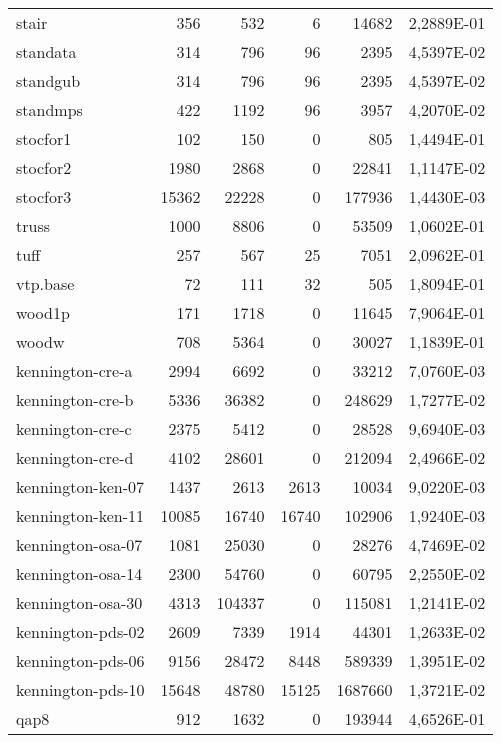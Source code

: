 {\begin{longtable}{>{\ttfamily}lrrrrc}
stair        		& 356       & 532       & 6           & 14682    & \num{2,2889E-01} \\
standata     		& 314       & 796       & 96          & 2395     & \num{4,5397E-02} \\
standgub     		& 314       & 796       & 96          & 2395     & \num{4,5397E-02} \\
standmps     		& 422       & 1192      & 96          & 3957     & \num{4,2070E-02} \\
stocfor1     		& 102       & 150       & 0           & 805      & \num{1,4494E-01} \\
stocfor2     		& 1980      & 2868      & 0           & 22841    & \num{1,1147E-02} \\
stocfor3     		& 15362     & 22228     & 0           & 177936   & \num{1,4430E-03} \\
truss        		& 1000      & 8806      & 0           & 53509    & \num{1,0602E-01} \\
tuff         		& 257       & 567       & 25          & 7051     & \num{2,0962E-01} \\
vtp.base     		& 72        & 111       & 32          & 505      & \num{1,8094E-01} \\
wood1p       		& 171       & 1718      & 0           & 11645    & \num{7,9064E-01} \\
woodw        		& 708       & 5364      & 0           & 30027    & \num{1,1839E-01} \\
kennington-cre-a    & 2994      & 6692      & 0           & 33212    & \num{7,0760E-03} \\
kennington-cre-b    & 5336      & 36382     & 0           & 248629   & \num{1,7277E-02} \\
kennington-cre-c    & 2375      & 5412      & 0           & 28528    & \num{9,6940E-03} \\
kennington-cre-d    & 4102      & 28601     & 0           & 212094   & \num{2,4966E-02} \\
kennington-ken-07   & 1437      & 2613      & 2613        & 10034    & \num{9,0220E-03} \\
kennington-ken-11   & 10085     & 16740     & 16740       & 102906   & \num{1,9240E-03} \\
kennington-osa-07   & 1081      & 25030     & 0           & 28276    & \num{4,7469E-02} \\
kennington-osa-14   & 2300      & 54760     & 0           & 60795    & \num{2,2550E-02} \\
kennington-osa-30   & 4313      & 104337    & 0           & 115081   & \num{1,2141E-02} \\
kennington-pds-02   & 2609      & 7339      & 1914        & 44301    & \num{1,2633E-02} \\
kennington-pds-06   & 9156      & 28472     & 8448        & 589339   & \num{1,3951E-02} \\
kennington-pds-10   & 15648     & 48780     & 15125       & 1687660  & \num{1,3721E-02} \\
qap8      			& 912       & 1632      & 0           & 193944   & \num{4,6526E-01} \\
\end{longtable}
}
